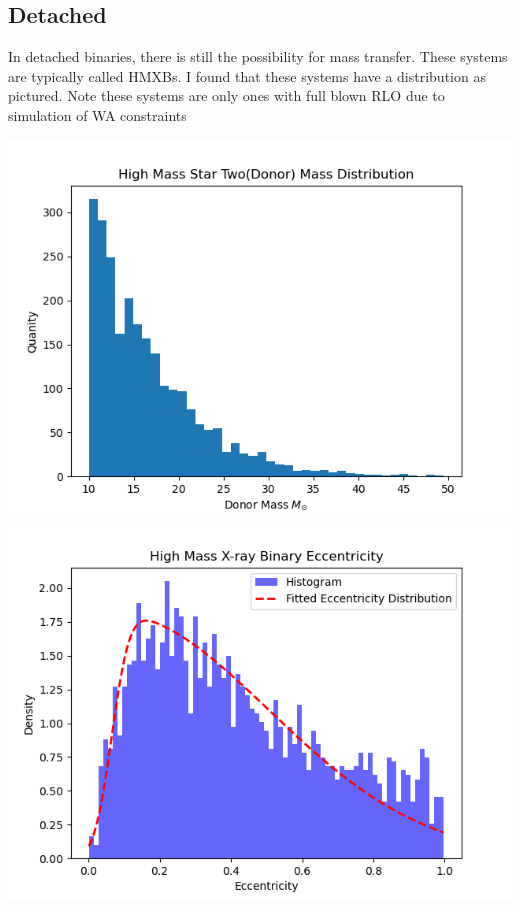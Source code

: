 \documentclass[12pt, letterpaper]{article}
\begin{document}
        \subsection{\centering Detached}
        In detached binaries, there is still the possibility for mass transfer. These systems are typically called HMXBs. I found that these systems have a distribution as pictured. Note these systems are only ones with full blown RLO due to simulation of WA constraints
        \begin{center}
            \includegraphics[scale = .6]{Figs/High Max X-ray Binary Star Two Mass Distro.png}
            \includegraphics[scale =.6]{Figs/High Mass X-ray Binary Eccentricity.png}
        \end{center}
\end{document}

